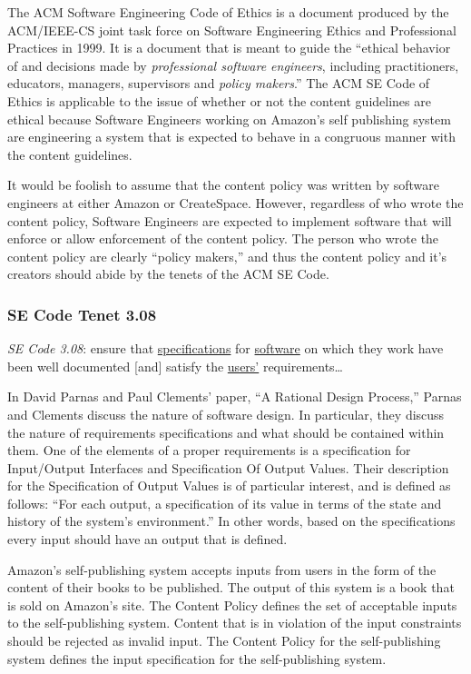 \documentclass[11pt]{article}
\begin{document}
\begin{multicols}{2}
The ACM Software Engineering Code of Ethics is a document produced by the ACM/IEEE-CS joint task force on Software Engineering Ethics and Professional Practices in 1999.  It is a document that is meant to guide the ``ethical behavior of and decisions made by \emph{professional software engineers}, including practitioners, educators, managers, supervisors and \emph{policy makers}.'' \cite[Emphasis Mine]{SECode} The ACM SE Code of Ethics is applicable to the issue of whether or not the content guidelines are ethical because Software Engineers working on Amazon's self publishing system are engineering a system that is expected to behave in a congruous manner with the content guidelines.

It would be foolish to assume that the content policy was written by software engineers at either Amazon or CreateSpace.  However, regardless of who wrote the content policy, Software Engineers are expected to implement software that will enforce or allow enforcement of the content policy.  The person who wrote the content policy are clearly ``policy makers,'' and thus the content policy and it's creators should abide by the tenets of the ACM SE Code.

\subsubsection{SE Code Tenet 3.08}

\emph{SE Code 3.08}: ensure that \underline{specifications} for \underline{software} on which they work have been well documented [and] satisfy the \underline{users'} requirements\ldots 

In David Parnas and Paul Clements' paper, ``A Rational Design Process,'' Parnas and Clements discuss the nature of software design. \cite{fakeit} In particular, they discuss the nature of requirements specifications and what should be contained within them.  One of the elements of a proper requirements is a specification for Input/Output Interfaces and Specification Of Output Values.  Their description for the Specification of Output Values is of particular interest, and is defined as follows: ``For each output, a specification of its value in terms of the state and history of the system's environment.'' \cite{fakeit} In other words, based on the specifications every input should have an output that is defined. 

Amazon's self-publishing system accepts inputs from users in the form of the content of their books to be published.  The output of this system is a book that is sold on Amazon's site.  The Content Policy defines the set of acceptable inputs to the self-publishing system.  Content that is in violation of the input constraints should be rejected as invalid input.  The Content Policy for the self-publishing system defines the input specification for the self-publishing system. 


\end{multicols}
\end{document}
